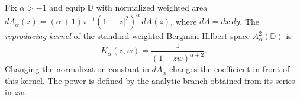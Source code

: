 
Fix $\alpha>-1$ and equip $\mathbb D$ with normalized weighted area $dA_\alpha(z)=(\alpha+1)\pi^{-1}(1-|z|^2)^\alpha\,dA(z)$, where $dA=dx\,dy$. The \emph{reproducing kernel} of the standard weighted Bergman Hilbert space $A_\alpha^2(\mathbb D)$ is
\[
K_\alpha(z,w)=\frac1{(1-z\overline w)^{\alpha+2}}.
\]
Changing the normalization constant in $dA_\alpha$ changes the coefficient in front of this kernel. The power is defined by the analytic branch obtained from its series in $z\overline w$.
